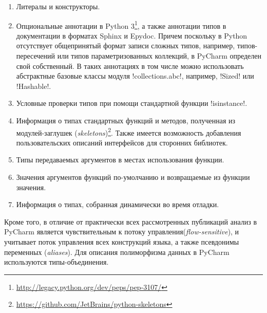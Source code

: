 \begin{enumerate}
    \item Литералы и конструкторы.

    \item Опциональные аннотации в Python
      3\footnote{\url{http://legacy.python.org/dev/peps/pep-3107/}}, а также
      аннотации типов в документации в форматах Sphinx и Epydoc. Причем поскольку в
      Python отсутствует общепринятый формат записи сложных типов, например,
      типов-пересечений или типов параметризованных коллекций, в PyCharm
      определен свой собственный.
      В таких аннотациях в том числе можно использовать абстрактные базовые
      классы модуля !collections.abc!, например, !Sized! или !Hashable!.

    \item Условные проверки типов при помощи стандартной функции !isinstance!.

    \item Информация о типах стандартных функций и методов, полученная из
        модулей-заглушек
        (\emph{skeletons})\footnote{\url{https://github.com/JetBrains/python-skeletons}}.
        Также имеется возможность добавления пользовательских описаний
        интерфейсов для сторонних библиотек.

    \item Типы передаваемых аргументов в местах использования функции.

    \item Значения аргументов функций по-умолчанию и возвращаемые из функции
        значения.

    \item Информация о типах, собранная динамически во время отладки.
\end{enumerate}

Кроме того, в отличие от практически всех рассмотренных публикаций анализ в
PyCharm является чувствительным к потоку управления(\emph{flow-sensitive}), и 
учитывает поток управления всех конструкций языка, а также псевдонимы
переменных (\emph{aliases}). Для описания полиморфизма данных в PyCharm
используются типы-объединения. 


